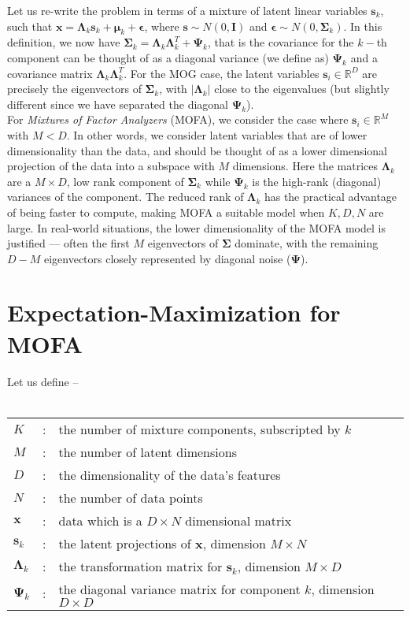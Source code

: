 \documentclass[letterpaper,12pt]{article}
\newcommand{\vect}[1]{\boldsymbol{#1}}
\newcommand{\data}{\vect{x}}
\newcommand{\latent}{\vect{s}}
\newcommand{\mean}{\vect{\mu}}
\newcommand{\cov}{\vect{\Sigma}}
\newcommand{\eye}{\vect{I}}
\newcommand{\lmda}{\vect{\Lambda}}
\newcommand{\ps}{\vect{\Psi}}
\begin{document}
Let us re-write the problem in terms of a mixture of latent linear variables $\latent_k$, such 
that $\data = \lmda_k \latent_k + \mean_k + \mathbf{\epsilon}$, where $\latent \sim N(0,\eye)$ and 
$\mathbf{\epsilon} \sim N(0,\cov_k)$.  In this definition, we now have 
$\cov_k = \lmda_k\lmda_k^T + \ps_k$,  that is the covariance for the $k-$th 
component can be thought of as a diagonal variance (we define as) $\ps_k$ and 
a covariance matrix $\lmda_k\lmda_k^T$.  For the MOG case, the latent variables 
$\latent_i \in \mathbb{R}^D$ are precisely the eigenvectors of $\cov_k$, with $|\lmda_k|$ 
 close to the eigenvalues (but slightly different since we have separated the diagonal $\ps_k$).  \\

For \emph{Mixtures of Factor Analyzers} (MOFA), we consider the case where 
$\latent_i \in \mathbb{R}^M$ with $M<D$.  In other words, we consider latent variables that are of 
lower dimensionality than the data, and should be thought of as a lower dimensional projection 
of the data into a subspace with $M$ dimensions.  Here the matrices $\lmda_k$ are a 
$M\times D$, low rank component of $\cov_k$ while $\ps_k$ is the high-rank (diagonal) variances 
of the component.  The reduced rank of $\lmda_k$ has the practical advantage of being faster 
to compute, making MOFA a suitable model when $K,D,N$ are large.  In real-world situations, the 
lower dimensionality of the MOFA model is justified --- often the first $M$ eigenvectors of $\cov$ 
dominate, with the remaining $D-M$ eigenvectors closely represented by diagonal noise ($\ps$).

\section{Expectation-Maximization for MOFA}

Let us define -- \\ \\
\begin{tabular}{lcl}
$K$ &:&the number of mixture components, subscripted by $k$\\
$M$&:& the number of latent dimensions\\
$D$&:& the dimensionality of the data's features\\
$N$ &:&the number of data points\\
$\data$ &:&data which is a $D\times N$ dimensional matrix\\ 
$\latent_k$ &:&the latent projections of $\data$, dimension $M\times N$\\
$\lmda_k$ &:&the transformation matrix for $\latent_k$, dimension $M\times D$\\
$\ps_k$ &:&the diagonal variance matrix for component $k$, dimension $D\times D$\\
\end{tabular}
\end{document}
